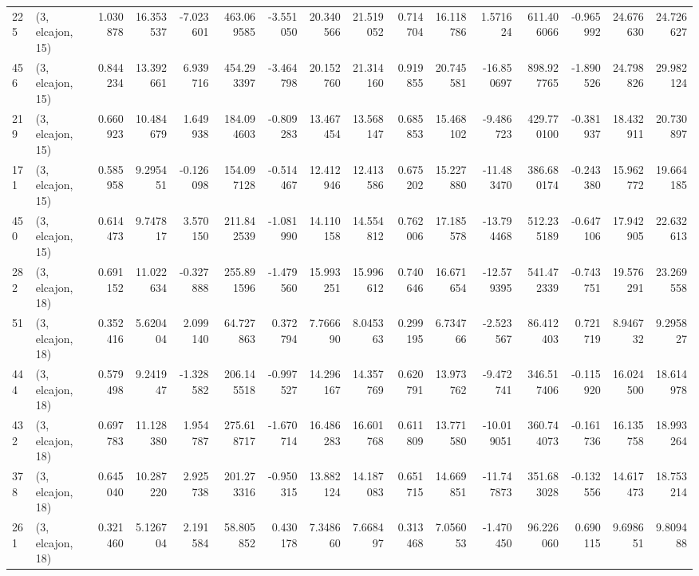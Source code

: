 \begin{tabular}{llrrrrrrrrrrrrrr}
225 &  (3, elcajon, 15) &   1.030878 &  16.353537 &  -7.023601 &   463.069585 &  -3.551050 &  20.340566 &  21.519052 &  0.714704 &  16.118786 &   1.571624 &    611.406066 &   -0.965992 &   24.676630 &   24.726627 \\
456 &  (3, elcajon, 15) &   0.844234 &  13.392661 &   6.939716 &   454.293397 &  -3.464798 &  20.152760 &  21.314160 &  0.919855 &  20.745581 & -16.850697 &    898.927765 &   -1.890526 &   24.798826 &   29.982124 \\
219 &  (3, elcajon, 15) &   0.660923 &  10.484679 &   1.649938 &   184.094603 &  -0.809283 &  13.467454 &  13.568147 &  0.685853 &  15.468102 &  -9.486723 &    429.770100 &   -0.381937 &   18.432911 &   20.730897 \\
171 &  (3, elcajon, 15) &   0.585958 &   9.295451 &  -0.126098 &   154.097128 &  -0.514467 &  12.412946 &  12.413586 &  0.675202 &  15.227880 & -11.483470 &    386.680174 &   -0.243380 &   15.962772 &   19.664185 \\
450 &  (3, elcajon, 15) &   0.614473 &   9.747817 &   3.570150 &   211.842539 &  -1.081990 &  14.110158 &  14.554812 &  0.762006 &  17.185578 & -13.794468 &    512.235189 &   -0.647106 &   17.942905 &   22.632613 \\
282 &  (3, elcajon, 18) &   0.691152 &  11.022634 &  -0.327888 &   255.891596 &  -1.479560 &  15.993251 &  15.996612 &  0.740646 &  16.671654 & -12.579395 &    541.472339 &   -0.743751 &   19.576291 &   23.269558 \\
51  &  (3, elcajon, 18) &   0.352416 &   5.620404 &   2.099140 &    64.727863 &   0.372794 &   7.766690 &   8.045363 &  0.299195 &   6.734766 &  -2.523567 &     86.412403 &    0.721719 &    8.946732 &    9.295827 \\
444 &  (3, elcajon, 18) &   0.579498 &   9.241947 &  -1.328582 &   206.145518 &  -0.997527 &  14.296167 &  14.357769 &  0.620791 &  13.973762 &  -9.472741 &    346.517406 &   -0.115920 &   16.024500 &   18.614978 \\
432 &  (3, elcajon, 18) &   0.697783 &  11.128380 &   1.954787 &   275.618717 &  -1.670714 &  16.486283 &  16.601768 &  0.611809 &  13.771580 & -10.019051 &    360.744073 &   -0.161736 &   16.135758 &   18.993264 \\
378 &  (3, elcajon, 18) &   0.645040 &  10.287220 &   2.925738 &   201.273316 &  -0.950315 &  13.882124 &  14.187083 &  0.651715 &  14.669851 & -11.747873 &    351.683028 &   -0.132556 &   14.617473 &   18.753214 \\
261 &  (3, elcajon, 18) &   0.321460 &   5.126704 &   2.191584 &    58.805852 &   0.430178 &   7.348660 &   7.668497 &  0.313468 &   7.056053 &  -1.470450 &     96.226060 &    0.690115 &    9.698651 &    9.809488 \\

\end{tabular}
